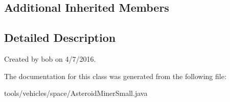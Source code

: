 \subsection*{Additional Inherited Members}


\subsection{Detailed Description}
Created by bob on 4/7/2016. 

The documentation for this class was generated from the following file\+:\begin{DoxyCompactItemize}
\item 
tools/vehicles/space/Asteroid\+Miner\+Small.\+java\end{DoxyCompactItemize}

